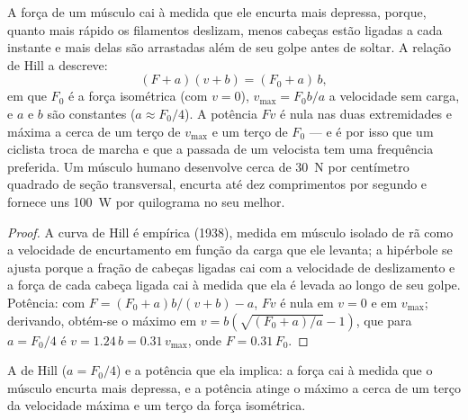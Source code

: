 \begin{theorem}\label{thm:b2:muscle-movement:hill}
A força de um músculo cai à medida que ele encurta mais depressa,
porque, quanto mais rápido os filamentos deslizam, menos cabeças estão
ligadas a cada instante e mais delas são arrastadas além de seu golpe
antes de soltar. A relação de Hill a descreve:
\[
(F + a)(v + b) = (F_0 + a)\,b,
\]
em que $F_0$ é a força isométrica (com $v = 0$), $v_{\max} =
F_0 b/a$ a velocidade sem carga, e $a$ e $b$ são constantes
($a \approx
F_0/4$). A potência $Fv$ é nula nas duas extremidades e máxima a cerca
de um terço de $v_{\max}$ e um terço de $F_0$ --- e é por isso que um
ciclista troca de marcha e que a passada de um velocista tem uma
frequência preferida. Um músculo humano desenvolve cerca de
\qty{30}{N} por centímetro quadrado de seção transversal, encurta até
dez comprimentos por segundo e fornece uns \qty{100}{W} por quilograma
no seu melhor.
\end{theorem}
\begin{proof}
A curva de Hill é empírica (1938), medida em músculo isolado de rã como
a velocidade de encurtamento em função da carga que ele levanta; a
hipérbole se ajusta porque a fração de cabeças ligadas cai com a
velocidade de deslizamento e a força de cada cabeça ligada cai à medida
que ela é levada ao longo de seu golpe. Potência: com
$F = (F_0 + a)b/(v + b) - a$, $Fv$ é nula em
$v = 0$ e em $v_{\max}$; derivando, obtém-se o máximo em
$v = b(\sqrt{(F_0 + a)/a} - 1)$, que para $a = F_0/4$ é $v =
1.24\,b = 0.31\,v_{\max}$, onde $F = 0.31\,F_0$.
\end{proof}

\begin{omfigure}

{\small A  de Hill ($a = F_0/4$) e a potência que
ela implica: a força cai à medida que o músculo encurta mais depressa, e
a potência atinge o máximo a cerca de um terço da velocidade máxima e
um terço da força isométrica.}
\end{omfigure}

